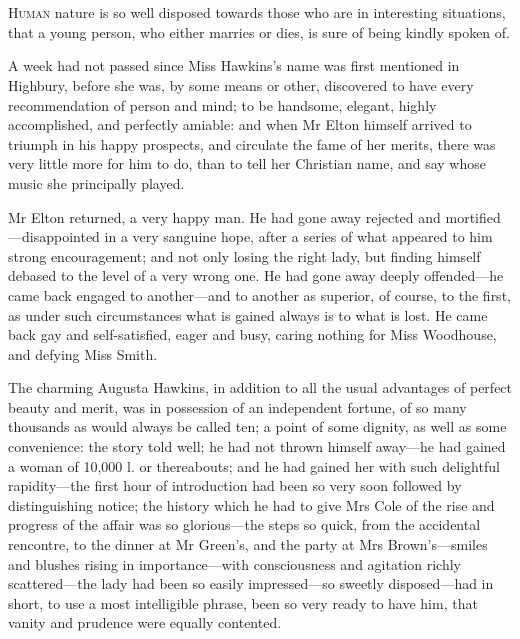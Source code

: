 \chapter[Chapter \thechapter]{}
\lettrine[lines=4,lraise=0.3]{H}{uman} nature is so well disposed towards those who are in interesting situations, that a young person, who either marries or dies, is sure of being kindly spoken of.

\zz
A week had not passed since Miss Hawkins's name was first mentioned in Highbury, before she was, by some means or other, discovered to have every recommendation of person and mind; to be handsome, elegant, highly accomplished, and perfectly amiable: and when Mr Elton himself arrived to triumph in his happy prospects, and circulate the fame of her merits, there was very little more for him to do, than to tell her Christian name, and say whose music she principally played.

Mr Elton returned, a very happy man. He had gone away rejected and mortified—disappointed in a very sanguine hope, after a series of what appeared to him strong encouragement; and not only losing the right lady, but finding himself debased to the level of a very wrong one. He had gone away deeply offended—he came back engaged to another—and to another as superior, of course, to the first, as under such circumstances what is gained always is to what is lost. He came back gay and self-satisfied, eager and busy, caring nothing for Miss Woodhouse, and defying Miss Smith.

The charming Augusta Hawkins, in addition to all the usual advantages of perfect beauty and merit, was in possession of an independent fortune, of so many thousands as would always be called ten; a point of some dignity, as well as some convenience: the story told well; he had not thrown himself away—he had gained a woman of 10,000 l. or thereabouts; and he had gained her with such delightful rapidity—the first hour of introduction had been so very soon followed by distinguishing notice; the history which he had to give Mrs Cole of the rise and progress of the affair was so glorious—the steps so quick, from the accidental rencontre, to the dinner at Mr Green's, and the party at Mrs Brown's—smiles and blushes rising in importance—with consciousness and agitation richly scattered—the lady had been so easily impressed—so sweetly disposed—had in short, to use a most intelligible phrase, been so very ready to have him, that vanity and prudence were equally contented.

